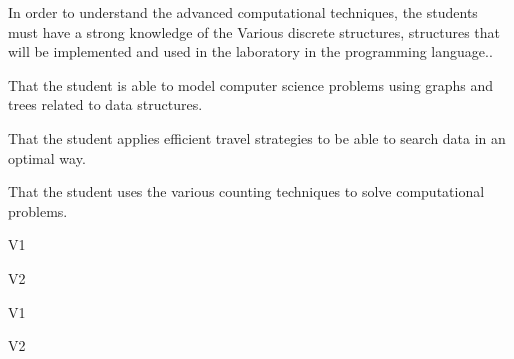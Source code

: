 \begin{syllabus}


\begin{justification}
In order to understand the advanced computational techniques, the students must have a strong knowledge of the
Various discrete structures, structures that will be implemented and used in the laboratory in the programming language..
\end{justification}

\begin{goals}
\item That the student is able to model computer science problems using graphs and trees related to data structures.
\item That the student applies efficient travel strategies to be able to search data in an optimal way.
\item That the student uses the various counting techniques to solve computational problems.
\end{goals}

\begin{outcomes}{V1}
    \item {}
    \item {}	
    \item {}
\end{outcomes}

\begin{outcomes}{V2}
    \item {}
    \item {}	
    \item {}
\end{outcomes}

\begin{competences}{V1}
    \item {}
    \item {}
    \item {}
\end{competences}

\begin{competences}{V2}
    \item {}
    \item {}
    \item {}
\end{competences}


\end{syllabus}
